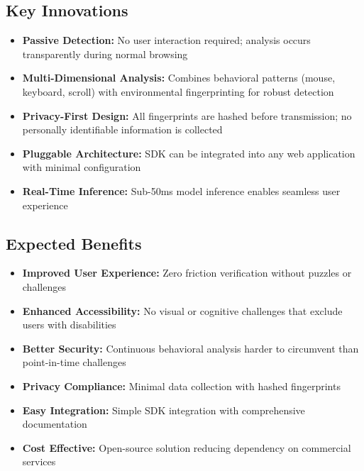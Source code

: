 \subsection{Key Innovations}

\begin{itemize}
    \item \textbf{Passive Detection:} No user interaction required; analysis occurs transparently during normal browsing
    
    \item \textbf{Multi-Dimensional Analysis:} Combines behavioral patterns (mouse, keyboard, scroll) with environmental fingerprinting for robust detection
    
    \item \textbf{Privacy-First Design:} All fingerprints are hashed before transmission; no personally identifiable information is collected
    
    \item \textbf{Pluggable Architecture:} SDK can be integrated into any web application with minimal configuration
    
    \item \textbf{Real-Time Inference:} Sub-50ms model inference enables seamless user experience
\end{itemize}

\subsection{Expected Benefits}

\begin{itemize}
    \item \textbf{Improved User Experience:} Zero friction verification without puzzles or challenges
    \item \textbf{Enhanced Accessibility:} No visual or cognitive challenges that exclude users with disabilities
    \item \textbf{Better Security:} Continuous behavioral analysis harder to circumvent than point-in-time challenges
    \item \textbf{Privacy Compliance:} Minimal data collection with hashed fingerprints
    \item \textbf{Easy Integration:} Simple SDK integration with comprehensive documentation
    \item \textbf{Cost Effective:} Open-source solution reducing dependency on commercial services
\end{itemize}

